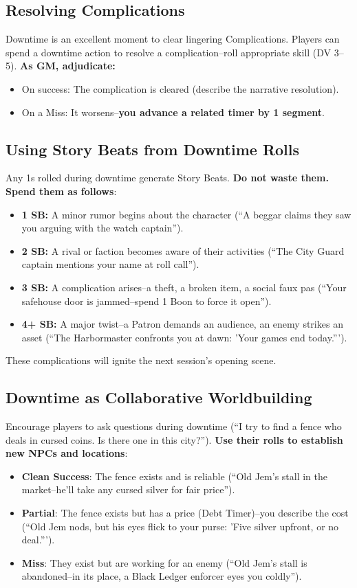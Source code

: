 \subsection{Resolving Complications}
Downtime is an excellent moment to clear lingering Complications. Players can spend a downtime action to resolve a complication--roll appropriate skill (DV 3--5). \textbf{As GM, adjudicate:} 
\begin{itemize}
  \item On success: The complication is cleared (describe the narrative resolution). 
  \item On a Miss: It worsens--\textbf{you advance a related timer by 1 segment}. 
\end{itemize}

\subsection{Using Story Beats from Downtime Rolls}
Any 1s rolled during downtime generate Story Beats. \textbf{Do not waste them. Spend them as follows}: 
\begin{itemize}
  \item \textbf{1 SB:} A minor rumor begins about the character (``A beggar claims they saw you arguing with the watch captain''). 
  \item \textbf{2 SB:} A rival or faction becomes aware of their activities (``The City Guard captain mentions your name at roll call''). 
  \item \textbf{3 SB:} A complication arises--a theft, a broken item, a social faux pas (``Your safehouse door is jammed--spend 1 Boon to force it open''). 
  \item \textbf{4+ SB:} A major twist--a Patron demands an audience, an enemy strikes an asset (``The Harbormaster confronts you at dawn: 'Your games end today.'''). 
\end{itemize}
These complications will ignite the next session's opening scene. 

\subsection{Downtime as Collaborative Worldbuilding}
Encourage players to ask questions during downtime (``I try to find a fence who deals in cursed coins. Is there one in this city?''). \textbf{Use their rolls to establish new NPCs and locations}: 
\begin{itemize}
  \item \textbf{Clean Success}: The fence exists and is reliable (``Old Jem's stall in the market--he'll take any cursed silver for fair price''). 
  \item \textbf{Partial}: The fence exists but has a price (Debt Timer)--you describe the cost (``Old Jem nods, but his eyes flick to your purse: 'Five silver upfront, or no deal.'''). 
  \item \textbf{Miss}: They exist but are working for an enemy (``Old Jem's stall is abandoned--in its place, a Black Ledger enforcer eyes you coldly''). 
\end{itemize}

